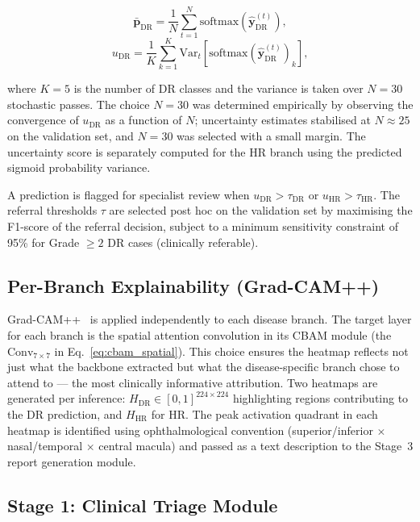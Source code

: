 \documentclass[review,12pt]{elsarticle}
\begin{document}
\begin{equation}
  \bar{\mathbf{p}}_{\text{DR}} = \frac{1}{N}\sum_{t=1}^{N}
  \text{softmax}(\hat{\mathbf{y}}_{\text{DR}}^{(t)}),
  \label{eq:mc_mean}
\end{equation}
\begin{equation}
  u_{\text{DR}} = \frac{1}{K}\sum_{k=1}^{K} \text{Var}_t
  \!\left[\text{softmax}(\hat{\mathbf{y}}_{\text{DR}}^{(t)})_k\right],
  \label{eq:mc_var}
\end{equation}

where $K=5$ is the number of DR classes and the variance is taken over $N=30$
stochastic passes. The choice $N=30$ was determined empirically by observing
the convergence of $u_{\text{DR}}$ as a function of $N$; uncertainty estimates
stabilised at $N \approx 25$ on the validation set, and $N=30$ was selected
with a small margin. The uncertainty score is separately computed for the HR
branch using the predicted sigmoid probability variance.

A prediction is flagged for specialist review when $u_{\text{DR}} >
\tau_{\text{DR}}$ or $u_{\text{HR}} > \tau_{\text{HR}}$. The referral
thresholds $\tau$ are selected post hoc on the validation set by maximising
the F1-score of the referral decision, subject to a minimum sensitivity
constraint of 95\% for Grade $\geq 2$ DR cases (clinically referable).

\subsection{Per-Branch Explainability (Grad-CAM++)}

Grad-CAM++~\cite{chattopadhyay2018} is applied independently to each disease
branch. The target layer for each branch is the spatial attention convolution
in its CBAM module (the $\text{Conv}_{7\times7}$ in Eq.~\ref{eq:cbam_spatial}).
This choice ensures the heatmap reflects not just what the backbone extracted
but what the disease-specific branch chose to attend to — the most clinically
informative attribution. Two heatmaps are generated per inference:
$H_{\text{DR}} \in [0,1]^{224 \times 224}$ highlighting regions contributing
to the DR prediction, and $H_{\text{HR}}$ for HR. The peak activation
quadrant in each heatmap is identified using ophthalmological convention
(superior/inferior $\times$ nasal/temporal $\times$ central macula) and passed
as a text description to the Stage~3 report generation module.

\subsection{Stage 1: Clinical Triage Module}
\end{document}
